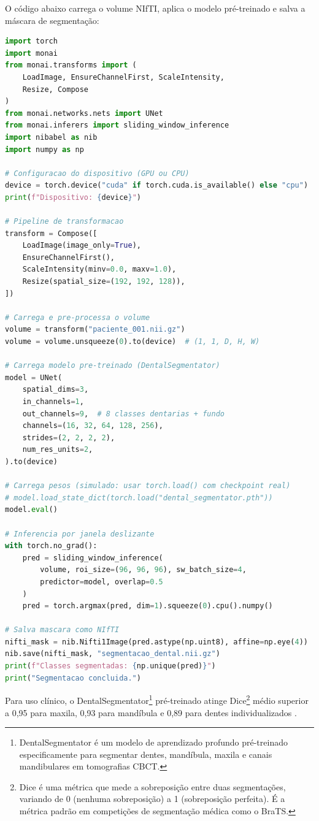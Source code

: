 O código abaixo carrega o volume NIfTI, aplica o modelo
pré-treinado e salva a máscara de segmentação:

\begin{lstlisting}[language=Python, caption={Segmentação de CBCT com MONAI e DentalSegmentator}, label={lst:monai_seg}]
import torch
import monai
from monai.transforms import (
    LoadImage, EnsureChannelFirst, ScaleIntensity,
    Resize, Compose
)
from monai.networks.nets import UNet
from monai.inferers import sliding_window_inference
import nibabel as nib
import numpy as np

# Configuracao do dispositivo (GPU ou CPU)
device = torch.device("cuda" if torch.cuda.is_available() else "cpu")
print(f"Dispositivo: {device}")

# Pipeline de transformacao
transform = Compose([
    LoadImage(image_only=True),
    EnsureChannelFirst(),
    ScaleIntensity(minv=0.0, maxv=1.0),
    Resize(spatial_size=(192, 192, 128)),
])

# Carrega e pre-processa o volume
volume = transform("paciente_001.nii.gz")
volume = volume.unsqueeze(0).to(device)  # (1, 1, D, H, W)

# Carrega modelo pre-treinado (DentalSegmentator)
model = UNet(
    spatial_dims=3,
    in_channels=1,
    out_channels=9,  # 8 classes dentarias + fundo
    channels=(16, 32, 64, 128, 256),
    strides=(2, 2, 2, 2),
    num_res_units=2,
).to(device)

# Carrega pesos (simulado: usar torch.load() com checkpoint real)
# model.load_state_dict(torch.load("dental_segmentator.pth"))
model.eval()

# Inferencia por janela deslizante
with torch.no_grad():
    pred = sliding_window_inference(
        volume, roi_size=(96, 96, 96), sw_batch_size=4,
        predictor=model, overlap=0.5
    )
    pred = torch.argmax(pred, dim=1).squeeze(0).cpu().numpy()

# Salva mascara como NIfTI
nifti_mask = nib.Nifti1Image(pred.astype(np.uint8), affine=np.eye(4))
nib.save(nifti_mask, "segmentacao_dental.nii.gz")
print(f"Classes segmentadas: {np.unique(pred)}")
print("Segmentacao concluida.")
\end{lstlisting}

Para uso clínico, o DentalSegmentator\footnote{DentalSegmentator é um
modelo de aprendizado profundo pré-treinado especificamente para
segmentar dentes, mandíbula, maxila e canais mandibulares em
tomografias CBCT.} pré-treinado atinge Dice\footnote{Dice é uma
métrica que mede a sobreposição entre duas segmentações, variando de
0 (nenhuma sobreposição) a 1 (sobreposição perfeita). É a métrica
padrão em competições de segmentação médica como o BraTS.} médio
superior a 0,95 para maxila, 0,93 para mandíbula e 0,89 para dentes
individualizados \cite{dot2024dental}.

